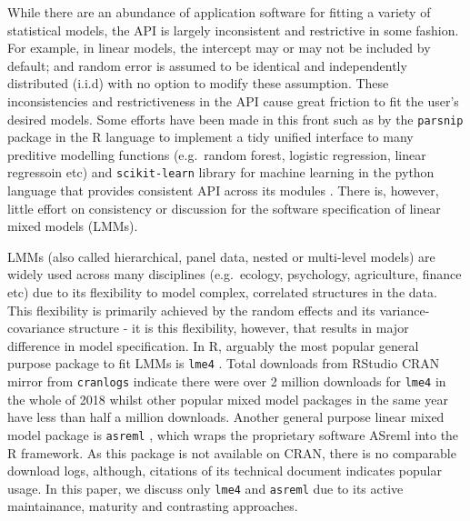 \documentclass[runningheads]{llncs}
\begin{document}
While there are an abundance of application software for fitting a variety of statistical models, the API is largely inconsistent and restrictive in some fashion. For example, in linear models, the intercept may or may not be included by default; and random error is assumed to be identical and independently distributed (i.i.d) with no option to modify these assumption. These inconsistencies and restrictiveness in the API cause great friction to fit the user's desired models. Some efforts have been made in this front such as by the \texttt{parsnip} package \autocite{Kuhn2018} in the R language \autocite{R2018} to implement a tidy unified interface to many preditive modelling functions (e.g.~random forest, logistic regression, linear regressoin etc) and \texttt{scikit-learn} library \autocite{scikit-learn} for machine learning in the python language \autocite{van1995python} that provides consistent API across its modules \autocite{sklearn_api}. There is, however, little effort on consistency or discussion for the software specification of linear mixed models (LMMs).

LMMs (also called hierarchical, panel data, nested or multi-level models) are widely used across many disciplines (e.g.~ecology, psychology, agriculture, finance etc) due to its flexibility to model complex, correlated structures in the data. This flexibility is primarily achieved by the random effects and its variance-covariance structure - it is this flexibility, however, that results in major difference in model specification. In R, arguably the most popular general purpose package to fit LMMs is \texttt{lme4} \autocite{Bates2015}. Total downloads from RStudio CRAN mirror from \texttt{cranlogs} \autocite{cranlog} indicate there were over 2 million downloads for \texttt{lme4} in the whole of 2018 whilst other popular mixed model packages \autocites[e.g. \texttt{nlme},][]{nlme}[\texttt{rstan},][]{rstan}[\texttt{brms},][]{brmsjss}{brmsr} in the same year have less than half a million downloads. Another general purpose linear mixed model package is \texttt{asreml} \autocite{Butler2009}, which wraps the proprietary software ASreml \autocite{Gilmour2009} into the R framework. As this package is not available on CRAN, there is no comparable download logs, although, citations of its technical document indicates popular usage. In this paper, we discuss only \texttt{lme4} and \texttt{asreml} due to its active maintainance, maturity and contrasting approaches.
\end{document}
